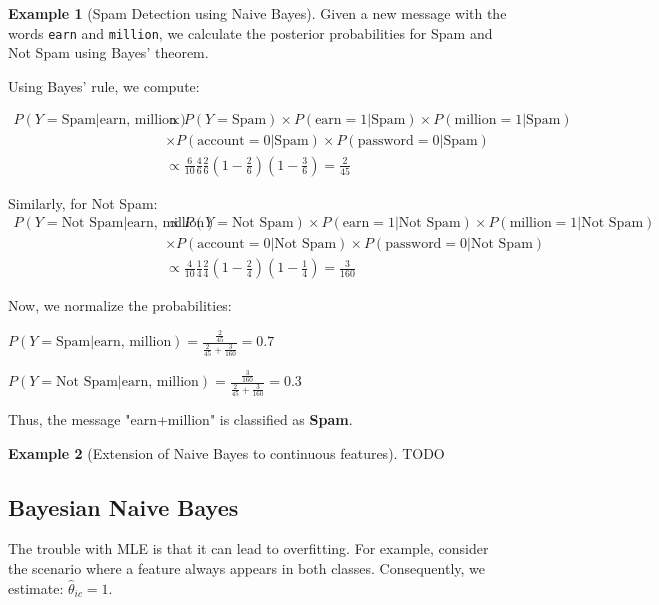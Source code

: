 \documentclass[12pt, a4paper]{article}
\theoremstyle{definition}
\newtheorem{example}{Example}[section]
\numberwithin{figure}{section}
\numberwithin{equation}{section}
\numberwithin{table}{section}
\begin{document}
\begin{example}[Spam Detection using Naive Bayes]
Given a new message with the words \texttt{earn} and \texttt{million}, we calculate the posterior probabilities for Spam and Not Spam using Bayes' theorem. 

Using Bayes' rule, we compute:

\begin{align}
P(Y = \text{Spam} | \text{earn, million})
&\propto P(Y = \text{Spam}) \times P(\text{earn} = 1 | \text{Spam}) \times P(\text{million} = 1 | \text{Spam})\\
&\times P(\text{account} = 0 | \text{Spam}) \times P(\text{password} = 0 | \text{Spam})\\
&\propto \frac{6}{10}\frac{4}{6}\frac{2}{6}\left(1-\frac{2}{6}\right)\left(1-\frac{3}{6}\right)=\frac{2}{45}
\end{align}

Similarly, for Not Spam:
\begin{align}
P(Y = \text{Not Spam} | \text{earn, million})
&\propto P(Y = \text{Not Spam}) \times P(\text{earn} = 1 | \text{Not Spam}) \times P(\text{million} = 1 | \text{Not Spam})\\
&\times P(\text{account} = 0 | \text{Not Spam}) \times P(\text{password} = 0 | \text{Not Spam})\\
&\propto \frac{4}{10}\frac{1}{4}\frac{2}{4}\left(1-\frac{2}{4}\right)\left(1-\frac{1}{4}\right)=\frac{3}{160}
\end{align}

Now, we normalize the probabilities:

$P(Y = \text{Spam} | \text{earn, million}) = \frac{\frac{2}{45}}{\frac{2}{45}+\frac{3}{160}}=0.7$

$P(Y = \text{Not Spam} | \text{earn, million}) = \frac{\frac{3}{160}}{\frac{2}{45}+\frac{3}{160}}=0.3$

Thus, the message "earn+million" is classified as \textbf{Spam}.
\end{example}

\begin{example}[Extension of Naive Bayes to continuous features]
TODO
\end{example}

\subsection{Bayesian Naive Bayes}
The trouble with MLE is that it can lead to overfitting. For example, consider the scenario where a feature always appears in both classes. Consequently, we estimate: $\hat{\theta}_{ic} = 1$.
\end{document}
